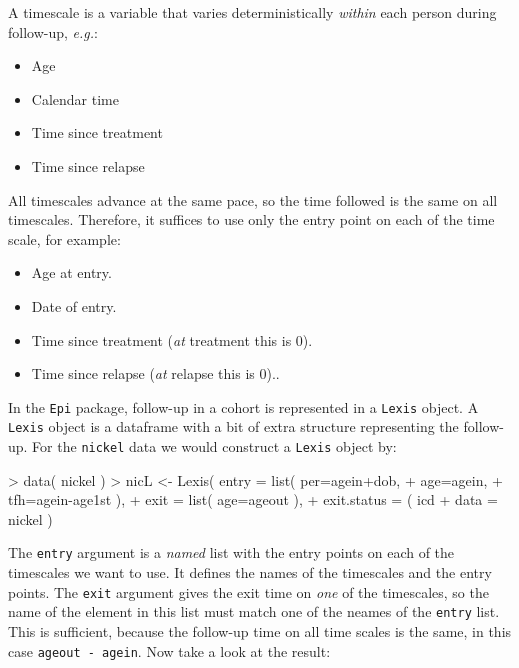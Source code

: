 \documentclass[a4paper,twoside,12pt]{article}
\begin{document}
A timescale is a variable that varies deterministically \emph{within}
each person during follow-up, \textit{e.g.}:
\begin{itemize}
  \item Age
  \item Calendar time
  \item Time since treatment
  \item Time since relapse
\end{itemize}
All timescales advance at the same pace, so the time followed is the
same on all timescales. Therefore, it suffices to use only the entry
point on each of the time scale, for example:
\begin{itemize}
  \item Age at entry.
  \item Date of entry.
  \item Time since treatment (\emph{at} treatment this is 0).
  \item Time since relapse (\emph{at} relapse this is 0)..
\end{itemize}
In the \texttt{Epi} package, follow-up in a cohort is represented in a
\texttt{Lexis} object.  A \texttt{Lexis} object is a dataframe with a
bit of extra structure representing the follow-up. For the
\texttt{nickel} data we would construct a \texttt{Lexis} object by:
\begin{Schunk}
\begin{Sinput}
> data( nickel )
> nicL <- Lexis( entry = list( per=agein+dob,
+                              age=agein,
+                              tfh=agein-age1st ),
+                 exit = list( age=ageout ),
+          exit.status = ( icd %in% c(162,163) )*1,
+                 data = nickel )
\end{Sinput}
\end{Schunk}
The \texttt{entry} argument is a \emph{named} list with the entry
points on each of the timescales we want to use. It defines the names
of the timescales and the entry points. The \texttt{exit} argument
gives the exit time on \emph{one} of the timescales, so the name of
the element in this list must match one of the neames of the
\texttt{entry} list. This is sufficient, because the follow-up time on
all time scales is the same, in this case \texttt{ageout - agein}. Now
take a look at the result:
\end{document}
